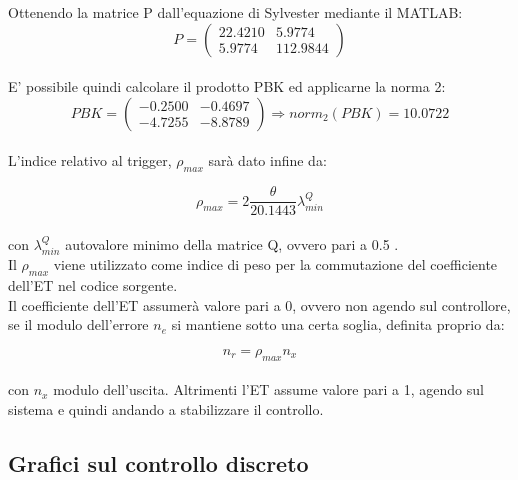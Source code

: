 \documentclass[a4paper,13pt]{article}
\begin{document}
	Ottenendo la matrice P dall'equazione di Sylvester mediante il MATLAB:\\
	
\begin{equation*}
	P=
\begin{pmatrix}

	22.4210&5.9774\\5.9774&112.9844

\end{pmatrix}
\end{equation*}\\

	E' possibile quindi calcolare il prodotto PBK ed applicarne la norma 2:\\
	
\begin{equation*}
	PBK=
\begin{pmatrix}

	-0.2500&-0.4697\\-4.7255&-8.8789

\end{pmatrix}
	\Rightarrow norm_{2}(PBK)=10.0722
\end{equation*}\\

	L'indice relativo al trigger, $\rho_{max}$ sarà dato infine da:
	
\begin{equation*}
	\rho_{max}=2\frac{\theta}{20.1443} \lambda_{min}^{Q}
\end{equation*}\\

	con $\lambda_{min}^{Q}$ autovalore minimo della matrice Q, ovvero pari a 0.5 .\\
	
	Il $\rho_{max}$ viene utilizzato come indice di peso per la commutazione del coefficiente dell'ET nel codice sorgente.
	\\ Il coefficiente dell'ET assumerà valore pari a 0, ovvero non agendo sul controllore, se il modulo dell'errore        	$n_{e}$ si mantiene sotto una certa soglia, definita proprio da:
	
\begin{equation*}
	n_{r}=\rho_{max}n_{x}
\end{equation*} \\

	con $n_{x}$ modulo dell'uscita.
	Altrimenti l'ET assume valore pari a 1, agendo sul sistema e quindi andando a stabilizzare il controllo.
	
\subsection{Grafici sul controllo discreto}
	
\end{document}
